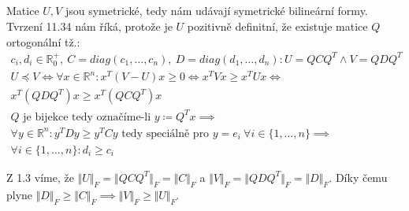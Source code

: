\documentclass[12pt, a4paper]{article}
\begin{document}
\subsection{}
Matice $U,V$ jsou symetrické, tedy nám udávají symetrické bilineární formy. Tvrzení 11.34 nám říká, protože je $U$ pozitivně definitní, že existuje matice $Q$ ortogonální tž.:
\begin{gather*}
c_i, d_i \in \mathbb{R}^+_0, \ C=diag(c_1,\dots, c_n), \ D = diag(d_1,\dots, d_n) : U=QCQ^T \land V = QDQ^T\\
U \preceq V \iff \forall x \in \mathbb{R}^n: x^T(V-U)x \geq 0 \iff x^TVx \geq x^TUx \iff\\
x^T(QDQ^T)x \geq x^T(QCQ^T)x\\
Q \text{ je bijekce tedy označíme-li } y \coloneqq Q^Tx \implies\\
\forall y \in \mathbb{R}^n: y^TDy \geq y^TCy \text{ tedy speciálně pro } y=e_i \ \forall i \in \{1, \dots, n\} \implies\\
\forall i \in \{1, \dots, n\}: d_i \geq c_i 
\end{gather*}

Z 1.3 víme, že $\Vert U \Vert_F = \Vert QCQ^T \Vert_F = \Vert C \Vert_F$ a $\Vert V \Vert_F = \Vert QDQ^T \Vert_F = \Vert D \Vert_F$. Díky čemu plyne $\Vert D \Vert_F \geq \Vert C \Vert_F \implies \Vert V \Vert_F \geq \Vert U \Vert_F$.
\end{document}
